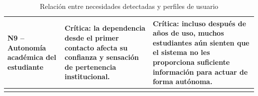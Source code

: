 {\begin{longtable}{|>{\bfseries}p{3.1cm}|p{5.35cm}|p{5.35cm}|}
N9 -- Autonomía académica del estudiante & Crítica: la dependencia desde el primer contacto afecta su confianza y sensación de pertenencia institucional. & Crítica: incluso después de años de uso, muchos estudiantes aún sienten que el sistema no les proporciona suficiente información para actuar de forma autónoma. \\
\hline

\caption{Relación entre necesidades detectadas y perfiles de usuario}\label{tab:relacion-necesidades-perfiles}
\end{longtable}
}

